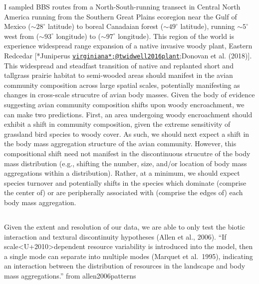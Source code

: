 \documentclass[12pt,twoside,openany]{reedthesis}
\begin{document}
I sampled BBS routes from a North-South-running transect in Central North America running from the Southern Great Plains ecoregion near the Gulf of Mexico (\(\sim 28^\circ\) latitude) to boreal Canadaian forest (\(\sim 49^\circ\) latitude), running \(\sim 5^\circ\) west from (\(\sim 93^\circ\) longitude) to (\(\sim 97^\circ\) longitude). This region of the world is experience widespread range expansion of a native invasive woody plant, Eastern Redcedar {[}*Juniperus \href{mailto:virginiana*;@twidwell2016plant}{\nolinkurl{virginiana*;@twidwell2016plant}};Donovan et al. (2018){]}. This widespread and steadfast transition of native and replanted short and tallgrass prairie habitat to semi-wooded areas should manifest in the avian community composition across large spatial scales, potentially manifesting as changes in cross-scale strucutre of avian body masses. Given the body of evidence suggesting avian community composition shifts upon woody encroachment, we can make two predictions. First, an area undergoing woody encroachment should exhibit a shift in community composition, given the extreme sensitivity of grassland bird species to woody cover. As such, we should next expect a shift in the body mass aggregation structure of the avian community. However, this compositional shift need not manifest in the discontinuous strucutre of the body mass distribution (e.g., shifting the number, size, and/or location of body mass aggregations within a distribution). Rather, at a minimum, we should expect species turnover and potentially shifts in the species which dominate (comprise the center of) or are peripherally associated with (comprise the edges of) each body mass aggregation.

\hypertarget{section}{%
\subsection{}\label{section}}

Given the extent and resolution of our data, we are able to only test the biotic interaction and textural discontinuity hypotheses (Allen et al., 2006).
``If scale\textless U+2010\textgreater dependent resource variability is introduced into the model, then a single mode can separate into multiple modes (Marquet et al.~1995), indicating an interaction between the distribution of resources in the landscape and body mass aggregations.'' from allen2006patterns
\end{document}
